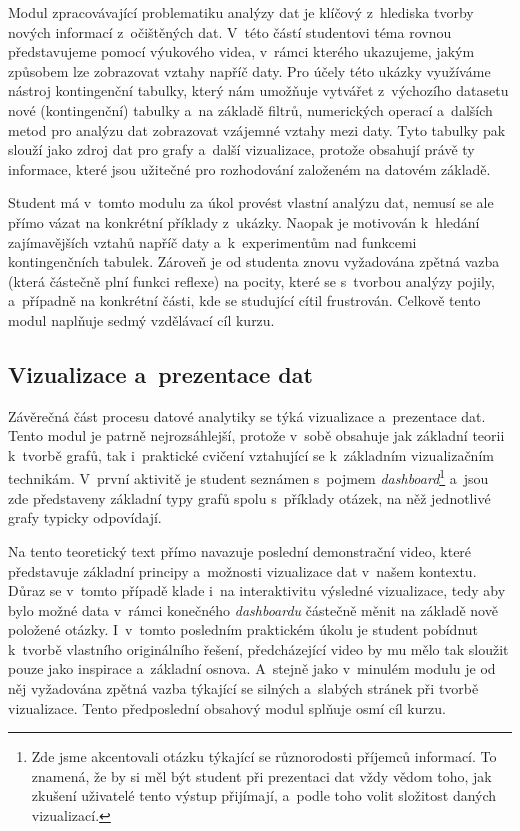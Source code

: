 Modul zpracovávající problematiku analýzy dat je klíčový z~hlediska tvorby nových informací z~očištěných dat. V~této částí studentovi téma rovnou představujeme pomocí výukového videa, v~rámci kterého ukazujeme, jakým způsobem lze zobrazovat vztahy napříč daty. Pro účely této ukázky využíváme nástroj kontingenční tabulky, který nám umožňuje vytvářet z~výchozího datasetu nové (kontingenční) tabulky a~na základě filtrů, numerických operací a~dalších metod pro analýzu dat zobrazovat vzájemné vztahy mezi daty. Tyto tabulky pak slouží jako zdroj dat pro grafy a~další vizualizace, protože obsahují právě ty informace, které jsou užitečné pro rozhodování založeném na datovém základě.

Student má v~tomto modulu za úkol provést vlastní analýzu dat, nemusí se ale přímo vázat na konkrétní příklady z~ukázky. Naopak je motivován k~hledání zajímavějších vztahů napříč daty a~k~experimentům nad funkcemi kontingenčních tabulek. Zároveň je od studenta znovu vyžadována zpětná vazba (která částečně plní funkci reflexe) na pocity, které se s~tvorbou analýzy pojily, a~případně na konkrétní části, kde se studující cítil frustrován. Celkově tento modul naplňuje sedmý vzdělávací cíl kurzu.

\hypertarget{vizualizace-a-prezentace-dat}{%
\subsection{Vizualizace a~prezentace dat}\label{vizualizace-a-prezentace-dat}}

Závěrečná část procesu datové analytiky se týká vizualizace a~prezentace dat. Tento modul je patrně nejrozsáhlejší, protože v~sobě obsahuje jak základní teorii k~tvorbě grafů, tak i~praktické cvičení vztahující se k~základním vizualizačním technikám. V~první aktivitě je student seznámen s~pojmem \emph{dashboard}\footnote{Zde jsme akcentovali otázku týkající se různorodosti příjemců informací. To znamená, že by si měl být student při prezentaci dat vždy vědom toho, jak zkušení uživatelé tento výstup přijímají, a~podle toho volit složitost daných vizualizací.} a~jsou zde představeny základní typy grafů spolu s~příklady otázek, na něž jednotlivé grafy typicky odpovídají.

Na tento teoretický text přímo navazuje poslední demonstrační video, které představuje základní principy a~možnosti vizualizace dat v~našem kontextu. Důraz se v~tomto případě klade i~na interaktivitu výsledné vizualizace, tedy aby bylo možné data v~rámci konečného \emph{dashboardu} částečně měnit na základě nově položené otázky. I~v~tomto posledním praktickém úkolu je student pobídnut k~tvorbě vlastního originálního řešení, předcházející video by mu mělo tak sloužit pouze jako inspirace a~základní osnova. A~stejně jako v~minulém modulu je od něj vyžadována zpětná vazba týkající se silných a~slabých stránek při tvorbě vizualizace. Tento předposlední obsahový modul splňuje osmí cíl kurzu.

